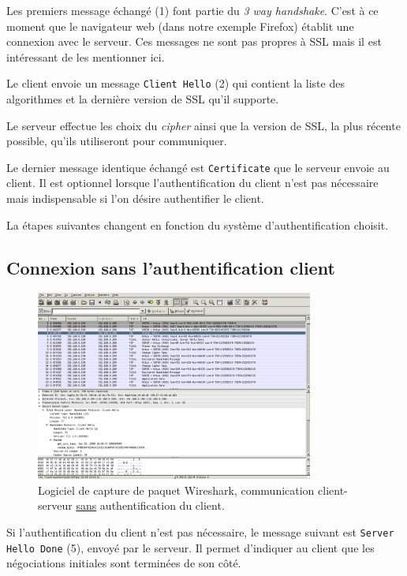 \documentclass[10pt,a4paper,titlepage]{article}
\begin{document}
Les premiers message échangé (1) font partie du \emph{3 way handshake}. C'est à ce moment que le navigateur web (dans notre exemple Firefox) établit une connexion avec le serveur. Ces messages ne sont pas propres à SSL mais il est intéressant de les mentionner ici.

Le client envoie un message \texttt{Client Hello} (2) qui contient la liste des algorithmes et la dernière version de SSL qu'il supporte.

Le serveur effectue les choix du \emph{cipher} ainsi que la version de SSL, la plus récente possible, qu'ils utiliseront pour communiquer.

Le dernier message identique échangé est \texttt{Certificate} que le serveur envoie au client. Il est optionnel lorsque l'authentification du client n'est pas nécessaire mais indispensable si l'on désire authentifier le client.

La étapes suivantes changent en fonction du système d'authentification choisit.

\subsection{Connexion sans l'authentification client}

\begin{figure}[htbp]
   \begin{center}
      \includegraphics[width=345px]{img/wireshark-nouser-auth.png}
   \end{center}
   \caption{Logiciel de capture de paquet Wireshark, communication client-serveur \underline{sans} authentification du client.}
	\label{fig:wireshark-nouserauth}
\end{figure}

Si l'authentification du client n'est pas nécessaire, le message suivant est \texttt{Server Hello Done} (5), envoyé par le serveur. Il permet d'indiquer au client que les négociations initiales sont terminées de son côté. 
\end{document}
